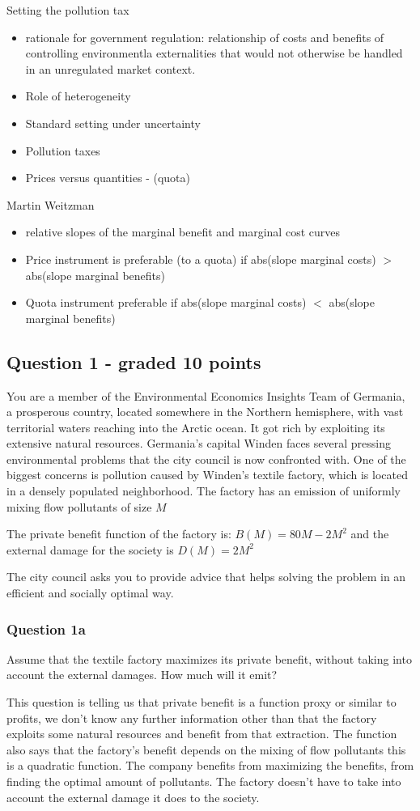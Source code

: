 \documentclass[11pt]{article} %
\begin{document}
Setting the pollution tax
\begin{itemize}
\item rationale for government regulation: relationship of costs and benefits of controlling environmentla externalities that would not otherwise be handled in an unregulated market context.
\item Role of heterogeneity
\item Standard setting under uncertainty
\item Pollution taxes
\item  Prices versus quantities - (quota)
\end{itemize}

Martin Weitzman
\begin{itemize}
\item  relative slopes of the marginal benefit and marginal cost curves
\item  Price instrument is preferable (to a quota) if abs(slope marginal costs) $>$ abs(slope marginal benefits)
\item  Quota instrument preferable if abs(slope marginal costs) $<$ abs(slope marginal benefits)
\end{itemize}

\subsection{Question 1 - graded 10 points}

You are a member of the Environmental Economics Insights Team of Germania, a prosperous country, located somewhere in the Northern hemisphere, with vast territorial waters reaching into the Arctic ocean. It got rich by exploiting its extensive natural resources. Germania’s capital Winden faces several pressing environmental problems that the city council is now confronted with. One of the biggest concerns is pollution caused by Winden’s textile factory, which is located in a densely populated neighborhood. The factory has an emission of uniformly mixing flow pollutants of size $M$

The private benefit function of the factory is:  $B(M)=80M-2M^2$ and the external damage for the society is $D(M)=2M^2$

The city council asks you to provide advice that helps solving the problem in an efficient and socially optimal way.

\subsubsection{Question 1a}
Assume that the textile factory maximizes its private benefit, without taking into account the external damages. How much will it emit? 

This question is telling us that private benefit is a function proxy or similar to profits, we don't know any further information other than that the factory exploits some natural resources and benefit from that extraction. The function also says that the factory's benefit depends on the mixing of flow pollutants this is a quadratic function. The company benefits from maximizing the benefits, from finding the optimal amount of pollutants. The factory doesn't have to take into account the external damage it does to the society.
\end{document}
